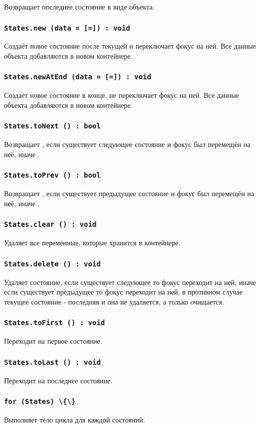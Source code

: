 Возвращает последнее состояние в виде объекта.

\subsubsection{\lstinline|States.new (data = [=]) : void|}

Создаёт новое состояние после текущей и переключает фокус на ней. Все данные объекта  добавляются в новом контейнере.

\subsubsection{\lstinline|States.newAtEnd (data = [=]) : void|}

Создаёт новое состояние в конце, не переключает фокус на ней. Все данные объекта  добавляются в новом контейнере.

\subsubsection{\lstinline|States.toNext () : bool|}

Возвращает \true, если существует следующее состояние и фокус был перемещён на неё, иначе \false.

\subsubsection{\lstinline|States.toPrev () : bool|}

Возвращает \true, если существует предыдущее состояние и фокус был перемещён на неё, иначе \false.

\subsubsection{\lstinline|States.clear () : void|}

Удаляет все переменные, которые хранится в контейнере.

\subsubsection{\lstinline|States.delete () : void|}

Удаляет состояние, если существует следующее то фокус переходит на ней, иначе если существует предыдущее то фокус переходит на ней, в противном случае текущее состояние - последняя и она не удаляется, а только очищается.

\subsubsection{\lstinline|States.toFirst () : void|}

Переходит на первое состояние.

\subsubsection{\lstinline|States.toLast () : void|}

Переходит на последнее состояние.

\subsubsection{\lstinline|for (States) \{\}|}

Выполняет тело цикла для каждой состояний.

